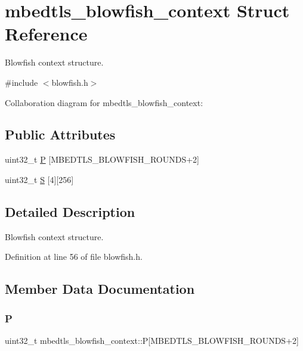 \hypertarget{structmbedtls__blowfish__context}{}\section{mbedtls\+\_\+blowfish\+\_\+context Struct Reference}
\label{structmbedtls__blowfish__context}


Blowfish context structure.  




{\ttfamily \#include $<$blowfish.\+h$>$}



Collaboration diagram for mbedtls\+\_\+blowfish\+\_\+context\+:
\subsection*{Public Attributes}
\begin{DoxyCompactItemize}
\item 
uint32\+\_\+t \mbox{\hyperlink{structmbedtls__blowfish__context_a6797f919a5b195cef17647d3d63ec13f}{P}} \mbox{[}M\+B\+E\+D\+T\+L\+S\+\_\+\+B\+L\+O\+W\+F\+I\+S\+H\+\_\+\+R\+O\+U\+N\+DS+2\mbox{]}
\item 
uint32\+\_\+t \mbox{\hyperlink{structmbedtls__blowfish__context_ab366ec526d9d5303483ed9c5bbb6a049}{S}} \mbox{[}4\mbox{]}\mbox{[}256\mbox{]}
\end{DoxyCompactItemize}


\subsection{Detailed Description}
Blowfish context structure. 

Definition at line 56 of file blowfish.\+h.



\subsection{Member Data Documentation}
\mbox{\label{structmbedtls__blowfish__context_a6797f919a5b195cef17647d3d63ec13f}} 
\subsubsection{\texorpdfstring{P}{P}}
{\footnotesize\ttfamily uint32\+\_\+t mbedtls\+\_\+blowfish\+\_\+context\+::P\mbox{[}M\+B\+E\+D\+T\+L\+S\+\_\+\+B\+L\+O\+W\+F\+I\+S\+H\+\_\+\+R\+O\+U\+N\+DS+2\mbox{]}}

